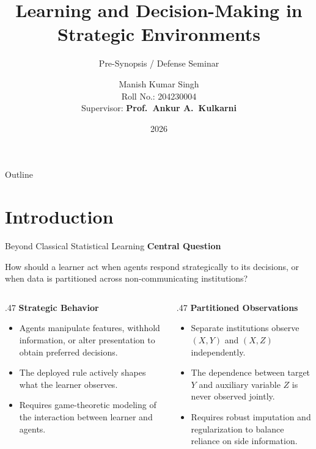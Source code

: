 \documentclass[aspectratio=169, 11pt, t, xcolor=table]{beamer}
\title[Learning in Strategic Environments]{%
  Learning and Decision-Making in\\Strategic Environments}
\subtitle{Pre-Synopsis / Defense Seminar}
\author[M.~K.~Singh]{%
  Manish Kumar Singh\\[0.1em]
  {\small Roll No.: 204230004}\\[0.2em]
  {\footnotesize Supervisor: \textbf{Prof.\ Ankur A.\ Kulkarni}}}
\institute[IIT Bombay]{%
  Centre for Systems and Control\\
  Indian Institute of Technology Bombay}
\date{2026}
\begin{document}

{
\begin{frame}[c]
  \titlepage
\end{frame}
}

\begin{frame}{Outline}
  \tableofcontents
\end{frame}

\section{Introduction}

\begin{frame}{Beyond Classical Statistical Learning}
\small
\textbf{Central Question}\par
How should a learner act when agents respond strategically to its decisions, or when data is partitioned across non-communicating institutions?
\par\vspace{1em}
\begin{columns}[T,onlytextwidth]
\begin{column}{.47\textwidth}
\textcolor{IITBNavy}{\textbf{Strategic Behavior}}
\begin{itemize}
\item Agents manipulate features, withhold information, or alter presentation to obtain preferred decisions.
\item The deployed rule actively shapes what the learner observes.
\item Requires game-theoretic modeling of the interaction between learner and agents.
\end{itemize}
\end{column}
\begin{column}{.47\textwidth}
\textcolor{IITBNavy}{\textbf{Partitioned Observations}}
\begin{itemize}
\item Separate institutions observe $(X,Y)$ and $(X,Z)$ independently.
\item The dependence between target $Y$ and auxiliary variable $Z$ is never observed jointly.
\item Requires robust imputation and regularization to balance reliance on side information.
\end{itemize}
\end{column}
\end{columns}
\end{frame}
\end{document}
